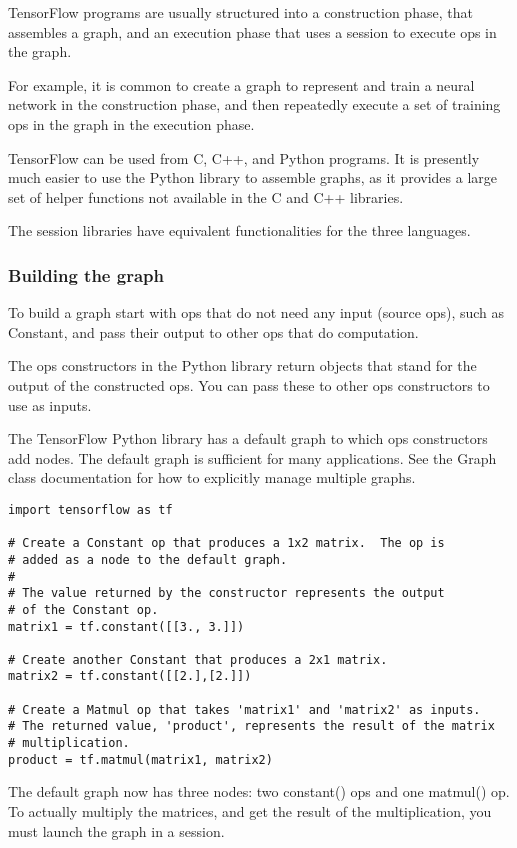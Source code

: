 \documentclass[a4paper,11pt,twoside]{ctexbook}
\begin{document}
TensorFlow programs are usually structured into a construction phase, that assembles a graph, and an execution phase that uses a session to execute ops in the graph.

For example, it is common to create a graph to represent and train a neural network in the construction phase, and then repeatedly execute a set of training ops in the graph in the execution phase.

TensorFlow can be used from C, C++, and Python programs. It is presently much easier to use the Python library to assemble graphs, as it provides a large set of helper functions not available in the C and C++ libraries.

The session libraries have equivalent functionalities for the three languages.

\subsubsection {Building the graph}
To build a graph start with ops that do not need any input (source ops), such as Constant, and pass their output to other ops that do computation.

The ops constructors in the Python library return objects that stand for the output of the constructed ops. You can pass these to other ops constructors to use as inputs.

The TensorFlow Python library has a default graph to which ops constructors add nodes. The default graph is sufficient for many applications. See the Graph class documentation for how to explicitly manage multiple graphs.

\begin{lstlisting}
import tensorflow as tf

# Create a Constant op that produces a 1x2 matrix.  The op is
# added as a node to the default graph.
#
# The value returned by the constructor represents the output
# of the Constant op.
matrix1 = tf.constant([[3., 3.]])

# Create another Constant that produces a 2x1 matrix.
matrix2 = tf.constant([[2.],[2.]])

# Create a Matmul op that takes 'matrix1' and 'matrix2' as inputs.
# The returned value, 'product', represents the result of the matrix
# multiplication.
product = tf.matmul(matrix1, matrix2)
\end{lstlisting}

The default graph now has three nodes: two constant() ops and one matmul() op. To actually multiply the matrices, and get the result of the multiplication, you must launch the graph in a session.
\end{document}
